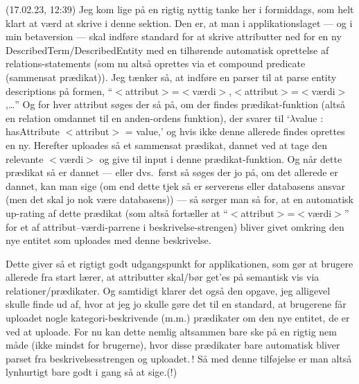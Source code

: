 \documentclass{report}
\begin{document}
(17.02.23, 12:39) Jeg kom lige på en rigtig nyttig tanke her i formiddags, som helt klart at værd at skrive i denne sektion. Den er, at man i applikationslaget --- og i min betaversion --- skal indføre standard for at skrive attributter ned for en ny DescribedTerm/DescribedEntity med en tilhørende automatisk oprettelse af relations-statements (som nu altså oprettes via et compound predicate (sammensat prædikat)). Jeg tænker så, at indføre en parser til at parse entity descriptions på formen, ``$<$attribut$>$=$<$værdi$>$,$<$attribut$>$=$<$værdi$>$,\ldots'' Og for hver attribut søges der så på, om der findes prædikat-funktion (altså en relation omdannet til en anden-ordens funktion), der svarer til `$\lambda$value : hasAttribute $<$attribut$>$ = value,' og hvis ikke denne allerede findes oprettes en ny. Herefter uploades så et sammensat prædikat, dannet ved at tage den relevante $<$værdi$>$ og give til input i denne prædikat-funktion. Og når dette prædikat så er dannet --- eller dvs.\ først så søges der jo på, om det allerede er dannet, kan man sige (om end dette tjek så er serverens eller databasens ansvar (men det skal jo nok være databasens)) --- så sørger man så for, at en automatisk up-rating af dette prædikat (som altså fortæller at ``$<$attribut$>$=$<$værdi$>$'' for et af attribut--værdi-parrene i beskrivelse-strengen) bliver givet omkring den nye entitet som uploades med denne beskrivelse. 

Dette giver så et rigtigt godt udgangspunkt for applikationen, som gør at brugere allerede fra start lærer, at attributter skal/bør get'es på semantisk vis via relationer/prædikater. Og samtidigt klarer det også den opgave, jeg alligevel skulle finde ud af, hvor at jeg jo skulle gøre det til en standard, at brugerene får uploadet nogle kategori-beskrivende (m.m.) prædikater om den nye entitet, de er ved at uploade. For nu kan dette nemlig altsammen bare ske på en rigtig nem måde (ikke mindst for brugerne), hvor disse prædikater bare automatisk bliver parset fra beskrivelsesstrengen og uploadet.\,! Så med denne tilføjelse er man altså lynhurtigt bare godt i gang så at sige.(!) 
\end{document}
